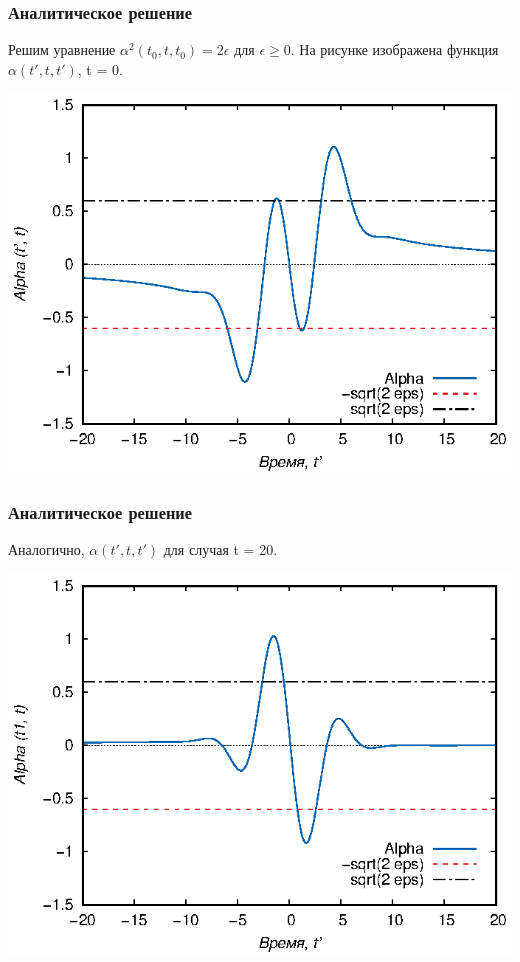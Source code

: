 \documentclass{beamer}
\begin{document}
\frame
{
	\frametitle{Аналитическое решение}
	Решим уравнение $\alpha ^2 (t_0, t, t_0) = 2 \epsilon$ для $\epsilon \ge 0$.
	На рисунке изображена функция $\alpha (t', t, t')$, t = 0.
	
	\begin{center}
		\includegraphics{alpha-200}  
	\end{center}	
}


\frame
{
	\frametitle{Аналитическое решение}
	Аналогично, $\alpha (t', t, t')$ для случая t = 20.
	
	\begin{center}
		\includegraphics{alpha-2020}  
	\end{center}	
}
\end{document}
